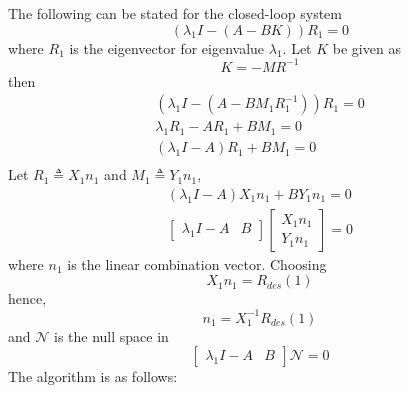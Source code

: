The following can be stated for the closed-loop system
\begin{equation}
    (\lambda_1 I-(A-BK))R_1=0
\end{equation}
where $R_1$ is the eigenvector for eigenvalue $\lambda_1$. Let $K$ be given as
\begin{equation}
    K=-MR^{-1}
\end{equation}
then
\begin{equation}
\begin{split}
    (\lambda_1 I-(A-BM_1R_1^{-1}))R_1=0\\
    \lambda_1 R_1-AR_1+BM_1=0\\
    (\lambda_1I-A)R_1+BM_1=0\\
\end{split}
\end{equation}
Let $R_1\triangleq X_1n_1$ and $M_1\triangleq Y_1n_1$,
\begin{equation}
    \begin{split}
        (\lambda_1I-A)X_1n_1+BY_1n_1=0\\
        \begin{bmatrix}
            \lambda_1I-A& B
        \end{bmatrix}\begin{bmatrix}
            X_1n_1\\ Y_1n_1
        \end{bmatrix}=0
    \end{split}
\end{equation}
where $n_1$ is the linear combination vector. Choosing
\begin{equation}
    X_1n_1=R_{des}(1)
\end{equation}
hence,
\begin{equation}
    n_1=X_1^{-1}R_{des}(1)
\end{equation}
and $\mathcal{N}$ is the null space in
\begin{equation}
    \begin{bmatrix}
        \lambda_1I-A& B
    \end{bmatrix}\mathcal{N}=0
\end{equation}
The algorithm is as follows:

